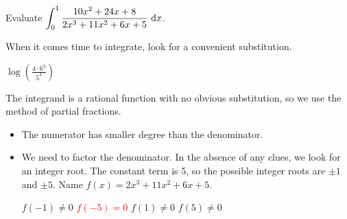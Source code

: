 \begin{question}
Evaluate $\displaystyle\int_0^1 \frac{10x^2+24x+8}{2x^3+11x^2+6x+5}~\mathrm{d}x$.
\end{question}
\begin{hint}
When it comes time to integrate, look for a convenient substitution.
\end{hint}
\begin{answer}
$\displaystyle\log \left(\frac{4\cdot 6^3}{5^3}\right)$
\end{answer}
\begin{solution}
The integrand is a rational function with no obvious substitution, so we use the method of partial fractions.
\begin{itemize}
\item The numerator has smaller degree than the denominator.
\item We need to factor the denominator. In the absence of any clues, we look for an integer root. The constant term is 5, so the possible integer roots are $\pm 1$ and $\pm 5$. Name $f(x) = 2x^3+11x^2+6x+5$.

\hfill
$f(-1)\neq0$
\hfill
\textcolor{red}{$f(-5)=0$}
\hfill
$f(1)\neq 0$
\hfill
$f(5)\neq 0$
\hfill~


\end{itemize}
\end{solution}
